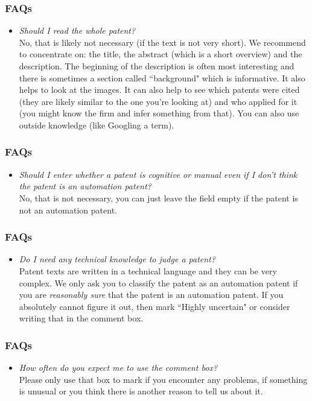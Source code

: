 \documentclass[10pt]{beamer}
\begin{document}
\begin{frame}\frametitle{FAQs}
	\begin{itemize}	
	\item \textit{Should I read the whole patent?}\\[0.1cm]
	No, that is likely not necessary (if the text is not very short). We recommend to concentrate on: the title, the abstract (which is a short overview) and the description. The beginning of the description is often most interesting and there is sometimes a section called ``background" which is informative. It also helps to look at the images. It can also help to see which patents were cited (they are likely similar to the one you're looking at) and who applied for it (you might know the firm and infer something from that). You can also use outside knowledge (like Googling a term). 
	\end{itemize}
\end{frame}	


\begin{frame}\frametitle{FAQs}
	\begin{itemize}	
	\item \textit{Should I enter whether a patent is cognitive or manual even if I don't think the patent is an automation patent?}\\[0.1cm]
	No, that is not necessary, you can just leave the field empty if the patent is not an automation patent.
	\end{itemize}
\end{frame}	


\begin{frame}\frametitle{FAQs}
	\begin{itemize}	
	\item \textit{Do I need any technical knowledge to judge a patent?}\\[0.1cm]
	Patent texts are written in a technical language and they can be very complex. We only ask you to classify the patent as an automation patent if you are \textit{reasonably sure} that the patent is an automation patent. If you absolutely cannot figure it out, then mark ``Highly uncertain" or consider writing that in the comment box.
	\end{itemize}
\end{frame}

	
\begin{frame}\frametitle{FAQs}
	\begin{itemize}	
	\item \textit{How often do you expect me to use the comment box?}\\[0.1cm]
	Please only use that box to mark if you encounter any problems, if something is unusual or you think there is another reason to tell us about it.
	\end{itemize}
\end{frame}	
\end{document}
